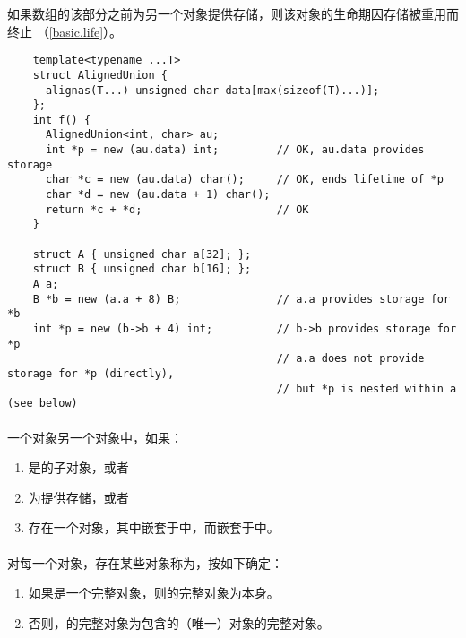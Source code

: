 \begin{note}
  如果数组的该部分之前为另一个对象提供存储，则该对象的生命期因存储被重用而终止
  （\ref{basic.life}）。
\end{note}

\begin{example}
  \begin{lstlisting}
    template<typename ...T>
    struct AlignedUnion {
      alignas(T...) unsigned char data[max(sizeof(T)...)];
    };
    int f() {
      AlignedUnion<int, char> au;
      int *p = new (au.data) int;         // OK, au.data provides storage
      char *c = new (au.data) char();     // OK, ends lifetime of *p
      char *d = new (au.data + 1) char();
      return *c + *d;                     // OK
    }

    struct A { unsigned char a[32]; };
    struct B { unsigned char b[16]; };
    A a;
    B *b = new (a.a + 8) B;               // a.a provides storage for *b
    int *p = new (b->b + 4) int;          // b->b provides storage for *p
                                          // a.a does not provide storage for *p (directly),
                                          // but *p is nested within a (see below)
  \end{lstlisting}
\end{example}

\paragraph{} %
一个对象另一个对象中，如果：
\begin{enumerate}
  \item {}是的子对象，或者
  \item {}为提供存储，或者
  \item 存在一个对象，其中嵌套于中，而嵌套于中。
\end{enumerate}

\paragraph{} %
对每一个对象，存在某些对象称为，按如下确定：
\begin{enumerate}
  \item 如果是一个完整对象，则的完整对象为本身。
  \item 否则，的完整对象为包含的（唯一）对象的完整对象。
\end{enumerate}

